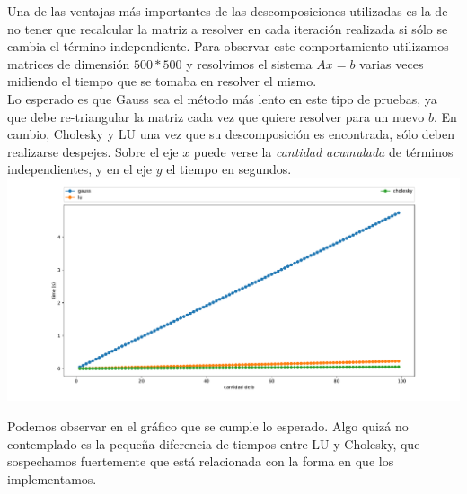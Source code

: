 Una de las ventajas más importantes de las descomposiciones utilizadas es la de no tener que recalcular la matriz a resolver en cada iteración realizada si sólo se cambia el término independiente. Para observar este comportamiento utilizamos matrices de dimensión $500*500$ y resolvimos el sistema $Ax = b$ varias veces midiendo el tiempo que se tomaba en resolver el mismo. \\

Lo esperado es que Gauss sea el método más lento en este tipo de pruebas, ya que debe re-triangular la matriz cada vez que quiere resolver para un nuevo $b$. En cambio, Cholesky y LU una vez que su descomposición es encontrada, sólo deben realizarse despejes. Sobre el eje $x$ puede verse la \textit{cantidad acumulada} de términos independientes, y en el eje $y$ el tiempo en segundos. \\
\hspace*{-2cm} \includegraphics[scale=0.55]{informe/imagenes/tytalus/DistintosBSuma-Dim500.pdf}

Podemos observar en el gráfico que se cumple lo esperado. Algo quizá no contemplado es la pequeña diferencia de tiempos entre LU y Cholesky, que sospechamos fuertemente que está relacionada con la forma en que los implementamos.





